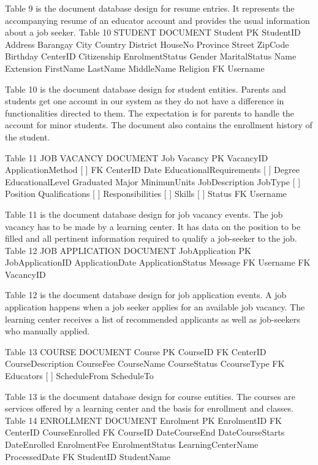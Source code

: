 Table 9 is the document database design for resume entries. It represents the accompanying resume of an educator account and provides the usual information about a job seeker.
Table 10
STUDENT DOCUMENT
Student
PK	StudentID
 	Address { }
 	 	Barangay
 		City
 		Country
 		District
 		HouseNo
 		Province
 		Street
 		ZipCode
 	Birthday
 	CenterID
 	Citizenship
 	EnrolmentStatus
 	Gender
 	MaritalStatus
 	Name { }
 	 	Extension
 		FirstName
 		LastName
 		MiddleName
 	Religion
FK	Username

Table 10 is the document database design for student entities. Parents and students get one account in our system as they do not have a difference in functionalities directed to them. The expectation is for parents to handle the account for minor students. The document also contains the enrollment history of the student.



Table 11
JOB VACANCY DOCUMENT
Job Vacancy
PK	VacancyID
 	ApplicationMethod [ ]
FK	CenterID
 	Date
 	EducationalRequirements [ ] { }
 	 	Degree
 		EducationalLevel
 		Graduated
 		Major
 		MinimunUnits
 	JobDescription
 	JobType [ ]
 	Position
 	Qualifications [ ]
 	Responsibilities [ ]
 	Skills [ ]
 	Status
FK	Username

Table 11 is the document database design for job vacancy events. The job vacancy has to be made by a learning center. It has data on the position to be filled and all pertinent information required to qualify a job-seeker to the job.
Table 12
JOB APPLICATION DOCUMENT
JobApplication
PK	JobApplicationID
 	ApplicationDate
 	ApplicationStatus
 	Message
FK	Username
FK	VacancyID

Table 12 is the document database design for job application events. A job application happens when a job seeker applies for an available job vacancy. The learning center receives a list of recommended applicants as well as job-seekers who manually applied.

Table 13
COURSE DOCUMENT
Course
PK	CourseID
FK	CenterID
 	CourseDescription
 	CourseFee
 	CourseName
 	CourseStatus
 	CcourseType
FK	Educators [ ]
 	ScheduleFrom
 	ScheduleTo

Table 13 is the document database design for course entities. The courses are services offered by a learning center and the basis for enrollment and classes.
Table 14
ENROLLMENT DOCUMENT
Enrolment
PK	EnrolmentID
FK	CenterID
 	CourseEnrolled
FK	CourseID
 	DateCourseEnd
 	DateCourseStarts
 	DateEnrolled
 	EnrolmentFee
 	EnrolmentStatus
 	LearningCenterName
 	ProcessedDate
FK	StudentID
 	StudentName

